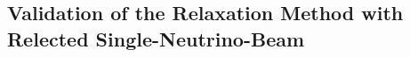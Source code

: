 






\subsection{\label{chap:halo-sec:line-sym}Validation of the Relaxation Method with Relected Single-Neutrino-Beam}


